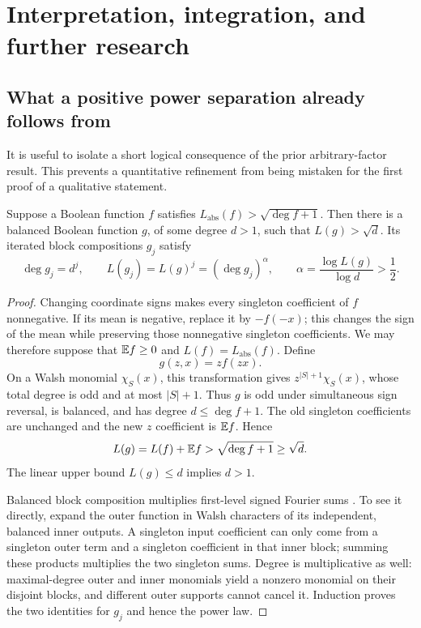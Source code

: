 \section{Interpretation, integration, and further research}
\label{sec:research}

\subsection{What a positive power separation already follows from}
\label{subsec:composition}

It is useful to isolate a short logical consequence of the prior
arbitrary-factor result. This prevents a quantitative refinement from
being mistaken for the first proof of a qualitative statement.

\begin{proposition}
\label{prop:composition}
Suppose a Boolean function \(f\) satisfies
\(L_{\mathrm{abs}}(f)>\sqrt{\deg f+1}\). Then there is a balanced
Boolean function \(g\), of some degree \(d>1\), such that
\(L(g)>\sqrt d\). Its iterated block compositions \(g_j\) satisfy
\[
 \deg g_j=d^j,\qquad L(g_j)=L(g)^j
 =(\deg g_j)^{\alpha},\qquad
 \alpha=\frac{\log L(g)}{\log d}>\frac12.
\]
\end{proposition}

\begin{proof}
Changing coordinate signs makes every singleton coefficient of \(f\)
nonnegative. If its mean is negative, replace it by \(-f(-x)\);
this changes the sign of the mean while preserving those nonnegative
singleton coefficients. We may therefore suppose that \(\mathbb E f\ge0\)
and \(L(f)=L_{\mathrm{abs}}(f)\).
Define
\[
 g(z,x)=z f(zx).
\]
On a Walsh monomial \(\chi_S(x)\), this transformation gives
\(z^{|S|+1}\chi_S(x)\), whose total degree is odd and at most
\(|S|+1\). Thus \(g\) is odd under simultaneous sign reversal,
is balanced, and has degree \(d\le\deg f+1\).
The old singleton coefficients are unchanged and the new \(z\)
coefficient is \(\mathbb E f\). Hence
\[
 L(g)=L(f)+\mathbb E f>\sqrt{\deg f+1}\ge\sqrt d.
\]
The linear upper bound \(L(g)\le d\) implies \(d>1\).

Balanced block composition multiplies first-level signed Fourier sums
\cite[Fact 2.7]{BlaisTanWan2015}. To see it directly, expand the outer
function in Walsh characters of its independent, balanced inner
outputs. A singleton input coefficient can only come from a singleton
outer term and a singleton coefficient in that inner block; summing
these products multiplies the two singleton sums.
Degree is multiplicative as well: maximal-degree outer and inner
monomials yield a nonzero monomial on their disjoint blocks, and
different outer supports cannot cancel it. Induction proves the two
identities for \(g_j\) and hence the power law.
\end{proof}

